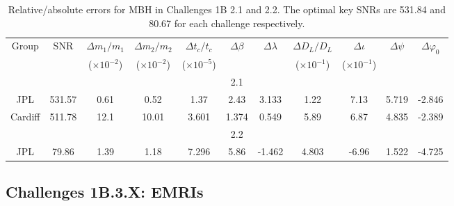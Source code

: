 \documentclass{iopart}
\begin{document}
\begin{table}[t]
\caption{Relative/absolute errors for MBH in Challenges 1B 2.1 and 2.2.  The optimal key SNRs are 531.84 and 80.67 for each challenge respectively.\label{tab:mbh}}
\begin{indented}
\item[] \begin{tabular}{ccccccccccc}\hline\hline
Group& SNR &$\Delta m_{1}/m_{1}$ & $\Delta m_{2}/ m_{2}$ & $\Delta t_{c} / t_{c}$ &$\Delta\beta  $ & $\Delta\lambda $ & $\Delta D_{L} / D_{L}$ & $\Delta\iota $ & $\Delta\psi $  & $\Delta\varphi_{0}$\\
& &($\times10^{-2}$) &  ($\times10^{-2}$) & ($\times10^{-5}$)  &   &   & ($\times10^{-1}$)  & ($\times10^{-1}$) &  &  \\
\hline
& & & & & 2.1  & & & & &\\
\hline
JPL & 531.57&0.61 & 	 0.52 &	 1.37 &	 2.43 & 	 3.133 &	 1.22 &	 7.13 & 	 5.719 &	 -2.846 \\ 
Cardiff & 511.78&12.1 & 	 10.01 &	 3.601 & 	 1.374 & 	 0.549 & 	 5.89 &	 6.87 & 	 4.835 & 	 -2.389 \\
\hline
& && & &  2.2 & & & & &\\
 \hline

JPL & 79.86&1.39 & 	 1.18 & 	 7.296 & 	 5.86 & 	 -1.462 & 	 4.803 & 	 -6.96 & 	 1.522 &	 -4.725 \\ 
\hline\hline
\end{tabular}
\end{indented}
\end{table}


\subsection{Challenges 1B.3.X: EMRIs}
\end{document}
